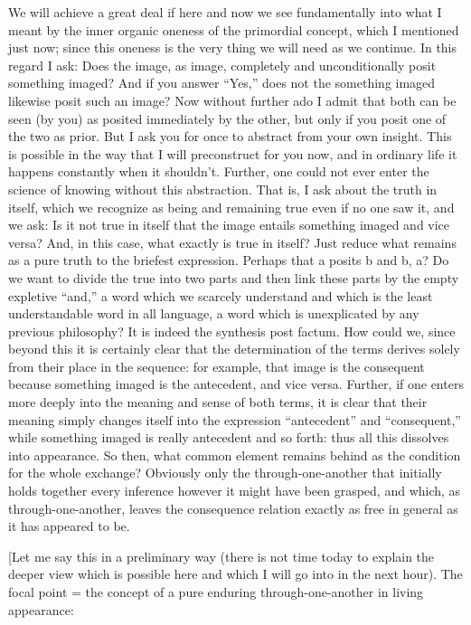 We will achieve a great deal if here and now
we see fundamentally into what I meant
by the inner organic oneness
of the primordial concept,
which I mentioned just now;
since this oneness is the very thing
we will need as we continue.
In this regard I ask:
Does the image, as image,
completely and unconditionally
posit something imaged?
And if you answer “Yes,”
does not the something imaged
likewise posit such an image?
Now without further ado I admit
that both can be seen (by you)
as posited immediately by the other,
but only if you posit one of the two as prior.
But I ask you for once to abstract from your own insight.
This is possible in the way
that I will preconstruct for you now,
and in ordinary life it happens
constantly when it shouldn't.
Further, one could not ever enter
the science of knowing without this abstraction.
That is, I ask about the truth in itself,
which we recognize as being and remaining true
even if no one saw it, and we ask:
Is it not true in itself that
the image entails something imaged
and vice versa?
And, in this case,
what exactly is true in itself?
Just reduce what remains as
a pure truth to the briefest expression.
Perhaps that a posits b and b, a?
Do we want to divide the true into two parts
and then link these parts
by the empty expletive “and,”
a word which we scarcely understand
and which is the least understandable word in all language,
a word which is unexplicated by any previous philosophy?
It is indeed the synthesis post factum.
How could we, since beyond this it is certainly clear
that the determination of the terms derives
solely from their place in the sequence:
for example, that image is the consequent
because something imaged is the antecedent,
and vice versa.
Further, if one enters more deeply into the
meaning and sense of both terms,
it is clear that their meaning simply changes itself
into the expression “antecedent” and “consequent,”
while something imaged is really antecedent and so forth:
thus all this dissolves into appearance.
So then, what common element remains behind
as the condition for the whole exchange?
Obviously only the through-one-another that
initially holds together every inference
however it might have been grasped,
and which, as through-one-another,
leaves the consequence relation exactly
as free in general as it has appeared to be.

[Let me say this in a preliminary way
(there is not time today to explain the
deeper view which is possible here and
which I will go into in the next hour).
The focal point = the concept of
a pure enduring through-one-another
in living appearance:

